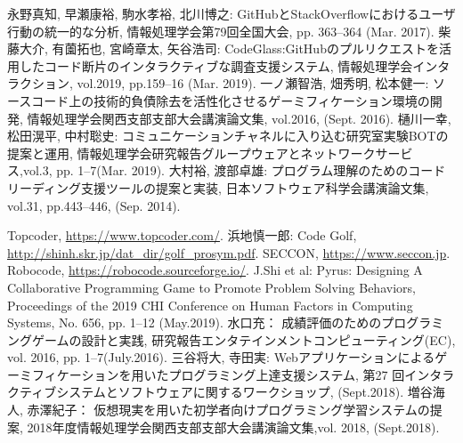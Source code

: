 \begin{thebibliography}{99}
	
	永野真知, 早瀬康裕, 駒水孝裕, 北川博之: GitHubとStackOverflowにおけるユーザ行動の統一的な分析, 情報処理学会第79回全国大会, pp. 363–364 (Mar. 2017).
	柴藤大介, 有薗拓也, 宮崎章太, 矢谷浩司: CodeGlass:GitHubのプルリクエストを活用したコード断片のインタラクティブな調査支援システム, 情報処理学会インタラクション, vol.2019, pp.159–16 (Mar. 2019).
	一ノ瀬智浩, 畑秀明, 松本健一: ソースコード上の技術的負債除去を活性化させるゲーミフィケーション環境の開発, 情報処理学会関西支部支部大会講演論文集, vol.2016, (Sept. 2016).
	樋川一幸, 松田滉平, 中村聡史: コミュニケーションチャネルに入り込む研究室実験BOTの提案と運用, 情報処理学会研究報告グループウェアとネットワークサービス,vol.3, pp. 1–7(Mar. 2019).
	大村裕, 渡部卓雄: プログラム理解のためのコードリーディング支援ツールの提案と実装, 日本ソフトウェア科学会講演論文集, vol.31, pp.443–446, (Sep. 2014).

	Topcoder, \url{https://www.topcoder.com/}.
	浜地慎一郎: Code Golf, \url{http://shinh.skr.jp/dat_dir/golf_prosym.pdf}.
	SECCON, \url{https://www.seccon.jp}.
	Robocode, \url{https://robocode.sourceforge.io/}.
	J.Shi et al: Pyrus: Designing A Collaborative Programming Game to Promote Problem Solving Behaviors, Proceedings of the 2019 CHI Conference on Human Factors in Computing Systems, No. 656, pp. 1–12 (May.2019).
	水口充： 成績評価のためのプログラミングゲームの設計と実践, 研究報告エンタテインメントコンピューティング(EC), vol. 2016, pp. 1–7(July.2016).
	三谷将大, 寺田実: Webアプリケーションによるゲーミフィケーションを用いたプログラミング上達支援システム, 第27 回インタラクティブシステムとソフトウェアに関するワークショップ, (Sept.2018).
	増谷海人, 赤澤紀子： 仮想現実を用いた初学者向けプログラミング学習システムの提案, 2018年度情報処理学会関西支部支部大会講演論文集,vol. 2018, (Sept.2018).

	
\end{thebibliography}